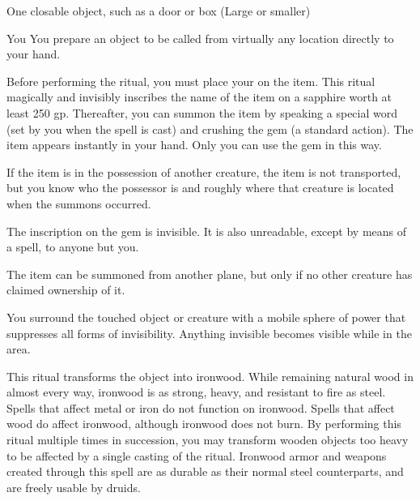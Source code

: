 \begin{spelltarget}{One closable object, such as a door or box (Large or smaller)}
\begin{spelltarget}{You}
\spelleffect You prepare an object to be called from virtually any location directly to your hand.
\par Before performing the ritual, you must place your  on the item. This ritual magically and invisibly inscribes the name of the item on a sapphire worth at least 250 gp. Thereafter, you can summon the item by speaking a special word (set by you when the spell is cast) and crushing the gem (a standard action). The item appears instantly in your hand. Only you can use the gem in this way.
\par If the item is in the possession of another creature, the item is not transported, but you know who the possessor is and roughly where that creature is located when the summons occurred.
\par The inscription on the gem is invisible. It is also unreadable, except by means of a  spell, to anyone but you.
\par The item can be summoned from another plane, but only if no other creature has claimed ownership of it.

\spelldur{\durlong \dismissable}
\spelleffect You surround the touched object or creature with a mobile sphere of power that suppresses all forms of invisibility. Anything invisible becomes visible while in the area.

\spelleffect This ritual transforms the object into ironwood. While remaining natural wood in almost every way, ironwood is as strong, heavy, and resistant to fire as steel. Spells that affect metal or iron do not function on ironwood. Spells that affect wood do affect ironwood, although ironwood does not burn.
\spellnotes By performing this ritual multiple times in succession, you may transform wooden objects too heavy to be affected by a single casting of the ritual. Ironwood armor and weapons created through this spell are as durable as their normal steel counterparts, and are freely usable by druids.


\end{spelltarget}
\end{spelltarget}

